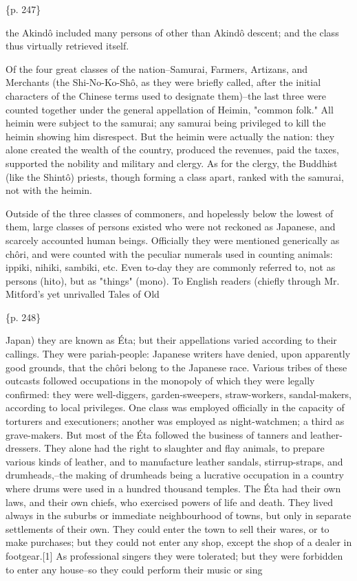 \{p. 247\}

the Akindô included many persons of other than Akindô descent; and the class thus virtually retrieved itself.



Of the four great classes of the nation--Samurai, Farmers, Artizans, and Merchants (the Shi-No-Ko-Shô, as they were briefly called, after the initial characters of the Chinese terms used to designate them)--the last three were counted together under the general appellation of Heimin, "common folk." All heimin were subject to the samurai; any samurai being privileged to kill the heimin showing him disrespect. But the heimin were actually the nation: they alone created the wealth of the country, produced the revenues, paid the taxes, supported the nobility and military and clergy. As for the clergy, the Buddhist (like the Shintô) priests, though forming a class apart, ranked with the samurai, not with the heimin.

Outside of the three classes of commoners, and hopelessly below the lowest of them, large classes of persons existed who were not reckoned as Japanese, and scarcely accounted human beings. Officially they were mentioned generically as chôri, and were counted with the peculiar numerals used in counting animals: ippiki, nihiki, sambiki, etc. Even to-day they are commonly referred to, not as persons (hito), but as "things" (mono). To English readers (chiefly through Mr. Mitford's yet unrivalled Tales of Old

\{p. 248\}

Japan) they are known as Éta; but their appellations varied according to their callings. They were pariah-people: Japanese writers have denied, upon apparently good grounds, that the chôri belong to the Japanese race. Various tribes of these outcasts followed occupations in the monopoly of which they were legally confirmed: they were well-diggers, garden-sweepers, straw-workers, sandal-makers, according to local privileges. One class was employed officially in the capacity of torturers and executioners; another was employed as night-watchmen; a third as grave-makers. But most of the Éta followed the business of tanners and leather-dressers. They alone had the right to slaughter and flay animals, to prepare various kinds of leather, and to manufacture leather sandals, stirrup-straps, and drumheads,--the making of drumheads being a lucrative occupation in a country where drums were used in a hundred thousand temples. The Éta had their own laws, and their own chiefs, who exercised powers of life and death. They lived always in the suburbs or immediate neighbourhood of towns, but only in separate settlements of their own. They could enter the town to sell their wares, or to make purchases; but they could not enter any shop, except the shop of a dealer in footgear.[1] As professional singers they were tolerated; but they were forbidden to enter any house--so they could perform their music or sing

